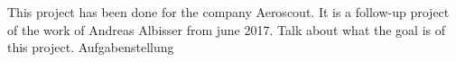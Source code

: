 %
This project has been done for the company Aeroscout. It is a follow-up project of the work of Andreas Albisser from june 2017.%
Talk about what the goal is of this project.
Aufgabenstellung
